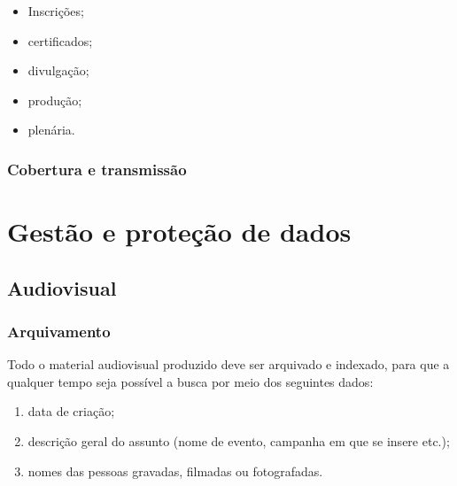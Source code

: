 \begin{itemize}
	\item
	Inscrições;
	\item
	certificados;
	\item
	divulgação;
	\item
	produção;
	\item
	plenária.
\end{itemize}

\subsubsection{Cobertura e transmissão}

\section{Gestão e proteção de
	dados}

\subsection{Audiovisual}

\subsubsection{Arquivamento}

Todo o material audiovisual produzido deve ser arquivado e indexado, para que a qualquer tempo seja possível a busca por meio dos seguintes dados:

\begin{enumerate}
	\def\labelenumi{\arabic{enumi}.}
	\item
	data de criação;
	\item
	descrição geral do assunto (nome de evento, campanha em que se insere  etc.);
	\item
	nomes das pessoas gravadas, filmadas ou fotografadas.
\end{enumerate}